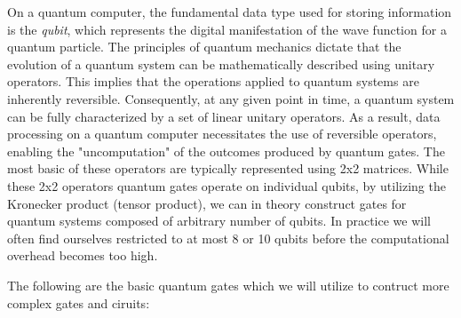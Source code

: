 \documentclass[onecolumn,10pt,cleanfoot]{asme2ej}
\begin{document}
On a quantum computer, the fundamental data type used for storing information is the \textit{qubit}, which represents the digital manifestation of the wave function for a quantum particle. The principles of quantum mechanics dictate that the evolution of a quantum system can be mathematically described using unitary operators. This implies that the operations applied to quantum systems are inherently reversible. Consequently, at any given point in time, a quantum system can be fully characterized by a set of linear unitary operators. As a result, data processing on a quantum computer necessitates the use of reversible operators, enabling the "uncomputation" of the outcomes produced by quantum gates. The most basic of these operators are typically represented using 2x2 matrices. While these 2x2 operators quantum gates operate on individual qubits, by utilizing the Kronecker product (tensor product), we can in theory construct gates for quantum systems composed of arbitrary number of qubits. In practice we will often find ourselves restricted to at most 8 or 10 qubits before the computational overhead becomes too high.

The following are the basic quantum gates which we will utilize to contruct more complex gates and ciruits: 
\end{document}
